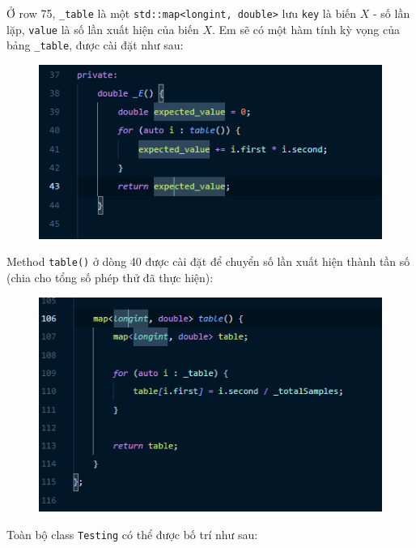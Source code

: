 \documentclass[12pt]{article}
\begin{document}
Ở row 75, \texttt{\_table} là một \texttt{std::map<longint, double>} lưu \texttt{key} là biến $X$ - số lần lặp, \texttt{value} là số lần xuất hiện của biến $X$. Em sẽ có một hàm tính kỳ vọng của bảng \texttt{\_table}, được cài đặt như sau:
\begin{figure}[H]
\centering
\includegraphics{private-e.PNG}
\end{figure}
Method \texttt{table()} ở dòng 40 được cài đặt để chuyển số lần xuất hiện thành tần số (chia cho tổng số phép thử đã thực hiện):
\begin{figure}[H]
\centering
\includegraphics{table-method.PNG}
\end{figure}
Toàn bộ class \texttt{Testing} có thể được bố trí như sau:
\end{document}

